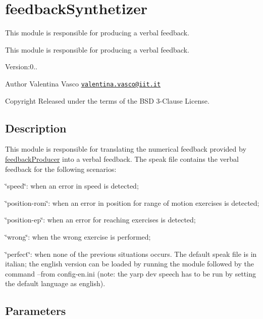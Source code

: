 \section{feedback\+Synthetizer}
\label{group__feedbackSynthetizer}


This module is responsible for producing a verbal feedback.  


This module is responsible for producing a verbal feedback. 

Version\+:0.. \begin{DoxyAuthor}{Author}
Valentina Vasco \href{mailto:valentina.vasco@iit.it}{\tt valentina.\+vasco@iit.\+it} ~\newline
 
\end{DoxyAuthor}
\begin{DoxyCopyright}{Copyright}
Released under the terms of the B\+SD 3-\/\+Clause License. 
\end{DoxyCopyright}
\hypertarget{group__skeletonViewer_intro_sec}{}\subsection{Description}\label{group__skeletonViewer_intro_sec}
This module is responsible for translating the numerical feedback provided by \hyperlink{group__feedbackProducer}{feedback\+Producer} into a verbal feedback. The speak file contains the verbal feedback for the following scenarios\+:
\begin{DoxyItemize}
\item \char`\"{}speed\char`\"{}\+: when an error in speed is detected;
\item \char`\"{}position-\/rom\char`\"{}\+: when an error in position for range of motion exercises is detected;
\item \char`\"{}position-\/ep\char`\"{}\+: when an error for reaching exercises is detected;
\item \char`\"{}wrong\char`\"{}\+: when the wrong exercise is performed;
\item \char`\"{}perfect\char`\"{}\+: when none of the previous situations occurs. The default speak file is in italian; the english version can be loaded by running the module followed by the command --from config-\/en.\+ini (note\+: the yarp dev speech has to be run by setting the default language as english).
\end{DoxyItemize}\hypertarget{group__skeletonViewer_parameters_sec}{}\subsection{Parameters}\label{group__skeletonViewer_parameters_sec}

